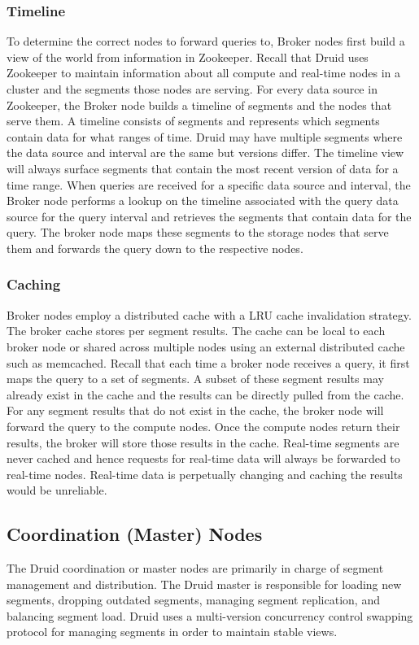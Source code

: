 \documentclass{vldb}
\begin{document}
\subsubsection{Timeline}
To determine the correct nodes to forward queries to, Broker nodes
first build a view of the world from information in Zookeeper. Recall
that Druid uses Zookeeper to maintain information about all compute
and real-time nodes in a cluster and the segments those nodes are
serving. For every data source in Zookeeper, the Broker node builds a
timeline of segments and the nodes that serve them. A timeline
consists of segments and represents which segments contain data for
what ranges of time. Druid may have multiple segments where the data
source and interval are the same but versions differ. The timeline
view will always surface segments that contain the most recent version
of data for a time range. When queries are received for a specific
data source and interval, the Broker node performs a lookup on the
timeline associated with the query data source for the query interval
and retrieves the segments that contain data for the query. The broker
node maps these segments to the storage nodes that serve them and
forwards the query down to the respective nodes.


\subsubsection{Caching}
\label{sec:caching}
Broker nodes employ a distributed cache with a LRU \cite{o1993lru,
kim2001lrfu} cache invalidation strategy. The broker cache stores
per segment results. The cache can be local to each broker node or
shared across multiple nodes using an external distributed cache
such as memcached. Recall that each time a broker node receives a
query, it first maps the query to a set of segments. A subset of
these segment results may already exist in the cache and the results
can be directly pulled from the cache. For any segment results that
do not exist in the cache, the broker node will forward the query
to the compute nodes. Once the compute nodes return their results,
the broker will store those results in the cache. Real-time segments
are never cached and hence requests for real-time data will always
be forwarded to real-time nodes. Real-time data is perpetually
changing and caching the results would be unreliable.


\subsection{Coordination (Master) Nodes}
The Druid coordination or master nodes are primarily in charge of
segment management and distribution. The Druid master is responsible
for loading new segments, dropping outdated segments, managing segment
replication, and balancing segment load. Druid uses a multi-version
concurrency control swapping protocol for managing segments in order
to maintain stable views.
\end{document}
